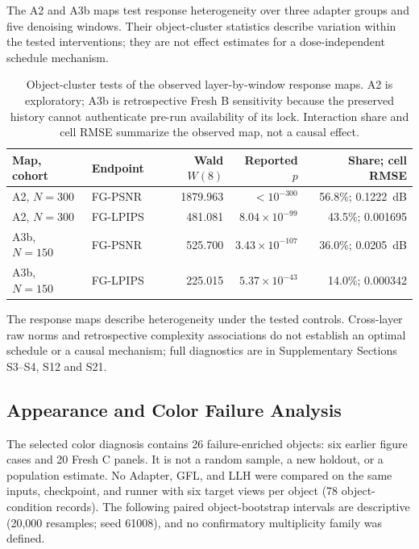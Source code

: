 \documentclass[times,twocolumn,final]{elsarticle}
\begin{document}
The A2 and A3b maps test response heterogeneity over three adapter groups and five denoising windows. Their object-cluster statistics describe variation within the tested interventions; they are not effect estimates for a dose-independent schedule mechanism.

\begin{table}[t]
\centering
\scriptsize
\setlength{\tabcolsep}{3pt}
\caption{Object-cluster tests of the observed layer-by-window response maps. A2 is exploratory; A3b is retrospective Fresh B sensitivity because the preserved history cannot authenticate pre-run availability of its lock. Interaction share and cell RMSE summarize the observed map, not a causal effect.}
\label{tab:layerwindow-main}
\begin{tabular}{llrrr}
\toprule
Map, cohort & Endpoint & Wald $W(8)$ & Reported $p$ & Share; cell RMSE \\
\midrule
A2, $N=300$ & FG-PSNR & 1879.963 & $<10^{-300}$ & 56.8\%; 0.1222~dB \\
A2, $N=300$ & FG-LPIPS & 481.081 & $8.04\times10^{-99}$ & 43.5\%; 0.001695 \\
A3b, $N=150$ & FG-PSNR & 525.700 & $3.43\times10^{-107}$ & 36.0\%; 0.0205~dB \\
A3b, $N=150$ & FG-LPIPS & 225.015 & $5.37\times10^{-43}$ & 14.0\%; 0.000342 \\
\bottomrule
\end{tabular}
\end{table}

The response maps describe heterogeneity under the tested controls. Cross-layer raw norms and retrospective complexity associations do not establish an optimal schedule or a causal mechanism; full diagnostics are in Supplementary Sections S3--S4, S12 and S21.

\subsection{Appearance and Color Failure Analysis}
\label{subsec:appearance-color}

The selected color diagnosis contains 26 failure-enriched objects: six earlier figure cases and 20 Fresh C panels. It is not a random sample, a new holdout, or a population estimate. No Adapter, GFL, and LLH were compared on the same inputs, checkpoint, and runner with six target views per object (78 object-condition records). The following paired object-bootstrap intervals are descriptive (20,000 resamples; seed 61008), and no confirmatory multiplicity family was defined.
\end{document}
